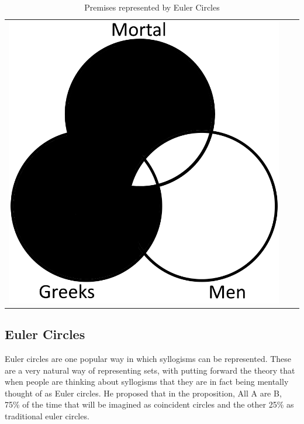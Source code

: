 \documentclass[12pt,a4paper]{report}
\begin{document}
\begin{table}[htb]
\begin{tabular}{ c  c  c }
\begin{minipage}{.29\textwidth}
      \includegraphics[scale=0.25]{VennAllGreeksAreMortal}
    \end{minipage}
    \\
  \end{tabular}
  \caption{Premises represented by Euler Circles}\label{tbl:eulerPremises}
\end{table}
\FloatBarrier



\subsection{Euler Circles}
Euler circles are one popular way in which syllogisms can be represented. 
These are a very natural way of representing sets, with \cite{Erickson1978-ERIROS} putting forward the theory that when people are thinking about syllogisms that they are in fact being mentally thought of as Euler circles. He proposed that in the proposition, All A are B, 75\% of the time that will be imagined as coincident circles and the other 25\% as traditional euler circles.
\end{document}
